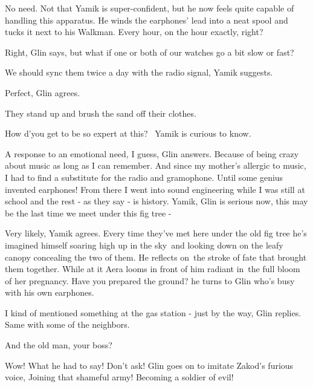 \documentclass[12pt]{book}
\begin{document}
{\textquotedbl}No need.{\textquotedbl} Not that Yamik is super-confident, but he now feels quite capable of handling
this apparatus. He winds the earphones' lead into a neat spool and tucks it next to his Walkman. {\textquotedbl}Every
hour, on the hour exactly, right?{\textquotedbl} \

{\textquotedbl}Right,{\textquotedbl} Glin says, {\textquotedbl}but what if one or both of our watches go a bit slow or
fast?{\textquotedbl}

{\textquotedbl}We should sync them twice a day with the radio signal,{\textquotedbl} Yamik suggests.

{\textquotedbl}Perfect,{\textquotedbl} Glin agrees.

They stand up and brush the sand off their clothes.

{\textquotedbl}How d'you get to be so expert at this?{\textquotedbl} \ Yamik is curious to know.

{\textquotedbl}A response to an emotional need, I guess,{\textquotedbl} Glin answers. {\textquotedbl}Because of being
crazy about music as long as I can remember. And since my mother's allergic to music, I had to find a substitute for
the radio and gramophone. Until some genius invented earphones! From there I went into sound engineering while I was
still at school and the rest - as they say - is history. Yamik,{\textquotedbl} Glin is serious now, {\textquotedbl}this
may be the last time we meet under this fig tree -{\textquotedbl}

{\textquotedbl}Very likely,{\textquotedbl} Yamik agrees. Every time they've met here under the old fig tree he's
imagined himself soaring high up in the sky~and looking down on the leafy canopy concealing the two of them. He
reflects on~the stroke of fate that brought them together. While at it Aera looms in front of him radiant in~the full
bloom of her pregnancy. {\textquotedbl}Have you prepared the ground?{\textquotedbl} he turns to Glin who's busy with
his own earphones.

{\textquotedbl}I kind of mentioned something at the gas station - just by the way,{\textquotedbl} Glin replies.
{\textquotedbl}Same with some of the neighbors.{\textquotedbl}

{\textquotedbl}And the old man, your boss?{\textquotedbl}

{\textquotedbl}Wow! What he had to say! Don't ask!{\textquotedbl} Glin goes on to imitate Zakod's furious voice,
{\textquotedbl}Joining that shameful army! Becoming a soldier of evil!{\textquotedbl}
\end{document}
